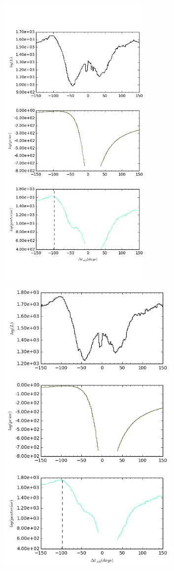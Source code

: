\documentclass[\docopts]{\docclass}
\begin{document}
\begin{figure}[!h]
  \centering
  \begin{minipage}[bottom]{0.4\textwidth}
\includegraphics[width=\textwidth, height=15cm, keepaspectratio]{whiten1/data5_full_log.png}
  \end{minipage}
  \hfill
  \begin{minipage}[bottom]{0.4\textwidth}
\includegraphics[width=\textwidth, height=15cm, keepaspectratio]{whiten2/data5_full_log.png}

\end{minipage}
\end{figure}
\end{document}
